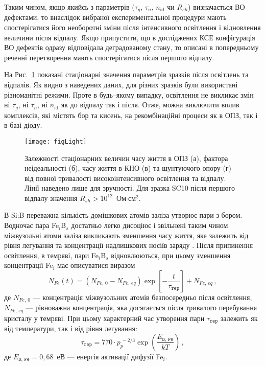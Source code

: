 Таким чином, якщо якийсь з параметрів ($\tau_g$, $\tau_n$, $n_{\mathrm{id}}$ чи $R_{sh}$) визначається ВО дефектами,
то внаслідок вибраної експериментальної процедури мають спостерігатися його необоротні зміни після інтенсивного освітлення і відновлення
величини після відпалу.
Якщо припустити, що в досліджених КСЕ конфігурація ВО дефектів одразу відповідала деградованому стану,
то описані в попередньому реченні перетворення мають спостерігатися після першого відпалу.

На Рис.~\ref{figLight} показані стаціонарні значення параметрів зразків після освітлень та відпалів.
Як видно з наведених даних, для різних зразків були використані різноманітні режими.
Проте в будь--якому випадку, освітлення не викликає змін ні $\tau_g$, ні $\tau_n$, ні $n_{\mathrm{id}}$ як до
відпалу так і після.
Отже, можна виключити вплив комплексів, які містять бор та кисень, на рекомбінаційні процеси
як в ОПЗ, так і в базі діоду.

\begin{figure}
\center
\texttt{[image: figLight]}
\caption{\label{figLight}
Залежності стаціонарних величин часу життя в ОПЗ (а),  фактора неідеальності (б), часу життя в КНО (в) та шунтуючого опору (г) від
повної тривалості високоінтенсивного освітлення та відпалу.
Лінії наведено лише для зручності.
Для зразка SC10 після першого відпалу значення $R_{sh}>10^{12}$~Ом$\cdot$см$^2$.
}%
\end{figure}


В Si:B переважна кількість домішкових атомів заліза утворює пари з бором.
Водночас пара Fe$_i$B$_s$ достатньо легко дисоціює і звільнені таким чином міжвузольні атоми заліза
викликають зменшення часу життя, яке залежить від рівня легування та концентрації надлишкових носіїв заряду \cite{FeB:Schmidt}.
Після припинення освітлення, в темряві, пари Fe$_i$B$_s$ відновлюються, при цьому
зменшення концентрації Fe$_i$ має описуватися виразом \cite{MurphyJAP2011,Wijaranakula}
\begin{equation}
\label{eqFeB}
N_{Fe}(t)=(N_{Fe,\,0}-N_{Fe,\,eq})\exp\left[-\frac{t}{\tau_{\mathtt{rep}}}\right]+N_{Fe,\,eq}\,,
\end{equation}
де
$N_{Fe,\,0}$ --- концентрація міжвузольних атомів безпосередньо після освітлення,
$N_{Fe,\,eq}$ --- рівноважна концентрація, яка досягається після тривалого перебування кристалу у темряві.
При цьому характерний час утворення пари $\tau_{\mathtt{rep}}$ залежить як від температури, так і від
рівня легування:
\begin{equation}
\label{eqTrep}
\tau_{\mathtt{rep}}=770\cdot p_p^{\,-2/3}\exp\left(\frac{E_{\mathtt{D,\,Fe}}}{kT}\right)\,,
\end{equation}
де
$E_{\mathtt{D,\,Fe}}=0,68$~еВ --- енергія активації дифузії Fe$_i$.


